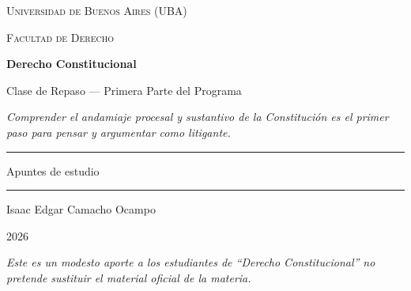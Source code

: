\documentclass[12pt,oneside]{book}
\newcommand{\universidad}{Universidad de Buenos Aires (UBA)}
\newcommand{\facultad}{Facultad de Derecho}
\newcommand{\materia}{Derecho Constitucional}
\newcommand{\titulo}{Clase de Repaso --- Primera Parte del Programa}
\newcommand{\autor}{Isaac Edgar Camacho Ocampo}
\newcommand{\anio}{2026}
\begin{document}
\begin{titlepage}

\thispagestyle{empty}

\begin{center}

\vspace*{1cm}

{\large \textsc{\universidad}}

\vspace{0.2cm}

{\large \textsc{\facultad}}

\vspace{3cm}

{\Huge \textbf{\materia}}

\vspace{1cm}

{\LARGE \titulo}

\vspace{0.8cm}

\textit{Comprender el andamiaje procesal y sustantivo de la Constitución es el primer paso para pensar y argumentar como litigante.}

\vspace{1.2cm}

\rule{0.70\textwidth}{0.5pt}

\vspace{0.5cm}

{\large Apuntes de estudio}

\vspace{0.5cm}

\rule{0.70\textwidth}{0.5pt}

\vfill

{\large \autor}

\vspace{0.3cm}

{\large \anio}

\end{center}

\vfill

\begin{flushleft}
\textit{Este es un modesto aporte a los estudiantes de ``Derecho Constitucional'' no pretende sustituir el material oficial de la materia.}
\end{flushleft}

\end{titlepage}

\tableofcontents

\end{document}
